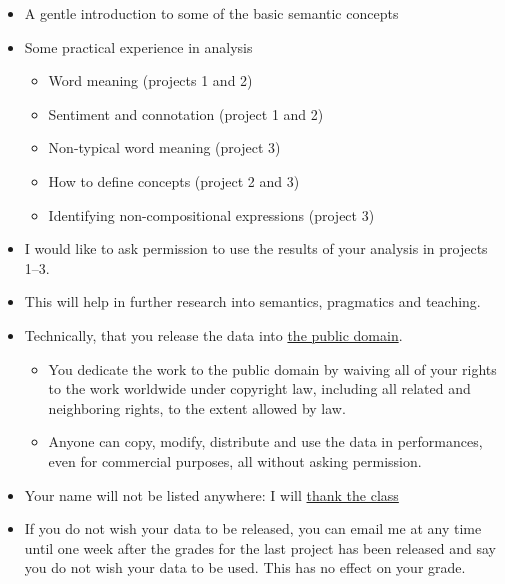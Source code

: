 \documentclass[a4paper,landscape,headrule,footrule,xetex]{foils}
\begin{document}
\begin{itemize}
\item A gentle introduction to some of the basic semantic concepts
\item Some practical experience in analysis
  \begin{itemize}
  \item Word meaning (projects 1 and 2)
  \item Sentiment and connotation (project 1 and 2)
  \item Non-typical word meaning (project 3)
  \item How to define concepts (project 2 and 3)
  \item Identifying non-compositional expressions (project 3)
  \end{itemize}
\end{itemize}


\begin{itemize}
\item I would like to ask permission to use the results of your
  analysis in projects 1--3.
\item This will help in further research into semantics, pragmatics
  and teaching.
\item Technically, that you release the data into \href{https://creativecommons.org/publicdomain/zero/1.0/}{the public domain}.
  \begin{itemize}
  \item You dedicate the work to the public domain by waiving all of
    your rights to the work worldwide under copyright law, including
    all related and neighboring rights, to the extent allowed by law.
  \item Anyone can copy, modify, distribute and use the data in
    performances, even for commercial purposes, all without asking
    permission.
  \end{itemize}
\item Your name will not be listed anywhere:
  I will \href{https://bond-lab.github.io/NTUMC/}{thank the class}
\item If you do not wish your data to be released, you can email me at
  any time until one week after the grades for the last project has
  been released and say you do not wish your data to be used.  This
  has no effect on your grade.
\end{itemize}
\end{document}
